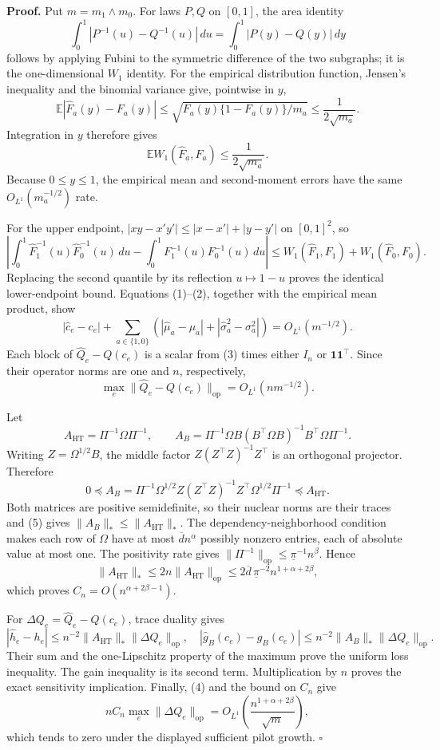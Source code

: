 \textbf{Proof.}
Put \(m=m_1\wedge m_0\).  For laws \(P,Q\) on \([0,1]\), the area identity
\[
\int_0^1|P^{-1}(u)-Q^{-1}(u)|\,du
=\int_0^1|P(y)-Q(y)|\,dy
\]
follows by applying Fubini to the symmetric difference of the two subgraphs; it is the one-dimensional \(W_1\) identity.  For the empirical distribution function, Jensen's inequality and the binomial variance give, pointwise in \(y\),
\[
\mathbb E|\widehat F_a(y)-F_a(y)|
\le\sqrt{F_a(y)\{1-F_a(y)\}/m_a}
\le\frac1{2\sqrt{m_a}}.
\]
Integration in \(y\) therefore gives
\[
\mathbb E W_1(\widehat F_a,F_a)\le\frac1{2\sqrt{m_a}}. \tag{1}
\]
Because \(0\le y\le1\), the empirical mean and second-moment errors have the same \(O_{L^1}(m_a^{-1/2})\) rate.

For the upper endpoint, \(|xy-x'y'|\le|x-x'|+|y-y'|\) on \([0,1]^2\), so
\[
\left|\int_0^1\widehat F_1^{-1}(u)\widehat F_0^{-1}(u)\,du
-\int_0^1F_1^{-1}(u)F_0^{-1}(u)\,du\right|
\le W_1(\widehat F_1,F_1)+W_1(\widehat F_0,F_0). \tag{2}
\]
Replacing the second quantile by its reflection \(u\mapsto1-u\) proves the identical lower-endpoint bound.  Equations (1)--(2), together with the empirical mean product, show
\[
|\widehat c_e-c_e|+\sum_{a\in\{1,0\}}
(|\widehat\mu_a-\mu_a|+|\widehat\sigma_a^2-\sigma_a^2|)
=O_{L^1}(m^{-1/2}). \tag{3}
\]
Each block of \(\widehat Q_e-Q(c_e)\) is a scalar from (3) times either \(I_n\) or \(\mathbf1\mathbf1^{\top}\).  Since their operator norms are one and \(n\), respectively,
\[
\max_e\lVert\widehat Q_e-Q(c_e)\rVert_{\mathrm{op}}
=O_{L^1}(nm^{-1/2}). \tag{4}
\]

Let
\[
A_{\mathrm{HT}}=\Pi^{-1}\Omega\Pi^{-1},
\qquad
A_B=\Pi^{-1}\Omega B(B^{\top}\Omega B)^{-1}B^{\top}\Omega\Pi^{-1}.
\]
Writing \(Z=\Omega^{1/2}B\), the middle factor
\(Z(Z^{\top}Z)^{-1}Z^{\top}\) is an orthogonal projector.  Therefore
\[
0\preceq A_B
=\Pi^{-1}\Omega^{1/2}
Z(Z^{\top}Z)^{-1}Z^{\top}
\Omega^{1/2}\Pi^{-1}
\preceq A_{\mathrm{HT}}. \tag{5}
\]
Both matrices are positive semidefinite, so their nuclear norms are their traces and (5) gives \(\lVert A_B\rVert_*\le\lVert A_{\mathrm{HT}}\rVert_*\).  The dependency-neighborhood condition makes each row of \(\Omega\) have at most \(\overline d n^\alpha\) possibly nonzero entries, each of absolute value at most one.  The positivity rate gives \(\lVert\Pi^{-1}\rVert_{\mathrm{op}}\le\underline\pi^{-1}n^\beta\).  Hence
\[
\lVert A_{\mathrm{HT}}\rVert_*
\le2n\lVert A_{\mathrm{HT}}\rVert_{\mathrm{op}}
\le2\overline d\,\underline\pi^{-2}n^{1+\alpha+2\beta},
\]
which proves \(C_n=O(n^{\alpha+2\beta-1})\).

For \(\Delta Q_e=\widehat Q_e-Q(c_e)\), trace duality gives
\[
|\widehat h_e-h_e|\le n^{-2}\lVert A_{\mathrm{HT}}\rVert_*\lVert\Delta Q_e\rVert_{\mathrm{op}},
\quad
|\widehat g_B(c_e)-g_B(c_e)|
\le n^{-2}\lVert A_B\rVert_*\lVert\Delta Q_e\rVert_{\mathrm{op}}.
\]
Their sum and the one-Lipschitz property of the maximum prove the uniform loss inequality.  The gain inequality is its second term.  Multiplication by \(n\) proves the exact sensitivity implication.  Finally, (4) and the bound on \(C_n\) give
\[
nC_n\max_e\lVert\Delta Q_e\rVert_{\mathrm{op}}
=O_{L^1}\!\left(\frac{n^{1+\alpha+2\beta}}{\sqrt m}\right),
\]
which tends to zero under the displayed sufficient pilot growth. \(\square\)